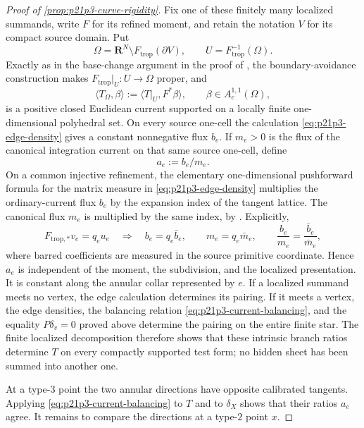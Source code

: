 \begin{proof}[Proof of \cref{prop:p21p3-curve-rigidity}]
Fix one of these finitely many localized summands, write \(F\) for its
refined moment, and retain the notation \(V\) for its compact source
domain.  Put
\[
 \Omega=\mathbf R^N\setminus F_{\mathrm{trop}}(\partial V),
 \qquad U=F_{\mathrm{trop}}^{-1}(\Omega).
\]
Exactly as in the base-change argument in the proof of
\cite[Theorem~16.8.5]{CLD25}, the boundary-avoidance construction makes
\(F_{\mathrm{trop}}|_U:U\to\Omega\) proper, and
\[
 \langle T_\Omega,\beta\rangle
       :=\langle T|_U,F^*\beta\rangle,
 \qquad \beta\in A_c^{1,1}(\Omega),
\]
is a positive closed Euclidean current supported on a locally finite
one-dimensional polyhedral set.  On every source one-cell the calculation
\eqref{eq:p21p3-edge-density} gives a constant nonnegative flux \(b_e\).
If \(m_e>0\) is the flux of the canonical integration current on that same
source one-cell, define
\begin{equation}
\label{eq:p21p3-branch-ratio}
                              a_e:=b_e/m_e.
\end{equation}
On a common injective refinement, the elementary one-dimensional
pushforward formula for the matrix measure in
\eqref{eq:p21p3-edge-density} multiplies the ordinary-current flux \(b_e\)
by the expansion index of the tangent lattice.  The canonical flux \(m_e\)
is multiplied by the same index, by
\cite[\S14.3.2, Lemma~14.3.4, and Proposition~14.4.2]{CLD25}.  Explicitly,
\[
 F_{\mathrm{trop},*}v_e=q_eu_e
 \quad\Longrightarrow\quad
 b_e=q_e\bar b_e,\qquad m_e=q_e\bar m_e,
 \qquad \frac{b_e}{m_e}=\frac{\bar b_e}{\bar m_e},
\]
where barred coefficients are measured in the source primitive
coordinate.  Hence
\(a_e\) is independent of the moment, the subdivision, and the localized
presentation.  It is
constant along the annular collar represented by \(e\).  If a localized
summand meets no vertex, the edge calculation determines its pairing.  If
it meets a vertex, the edge densities, the balancing relation
\eqref{eq:p21p3-current-balancing}, and the equality \(P\delta_v=0\) proved
above determine the pairing on the entire finite star.  The finite
localized decomposition therefore shows that these intrinsic branch
ratios determine \(T\) on every compactly supported test form; no hidden
sheet has been summed into another one.

At a type-$3$ point the two annular directions have opposite calibrated
tangents.  Applying \eqref{eq:p21p3-current-balancing} to \(T\) and to
\(\delta_X\) shows that their ratios \(a_e\) agree.  It remains to
compare the directions at a type-$2$ point \(x\).


\end{proof}
